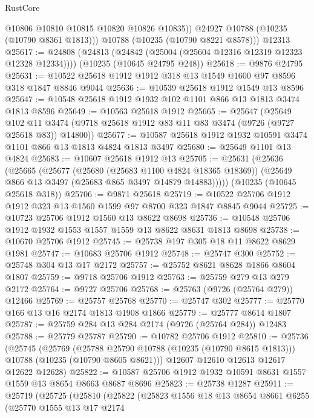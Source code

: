 \begin{lexlean}{RustCore}
\begin{coremodule}
            @10806
            @10810
            @10815
            @10820
            @10826
            @10835))
        @24927
        @10788
        (@10235 (@10790 @8361 @1813)))
      @10788
      (@10235 (@10790 @8221 @8578)))
    @12313
@25617 := @24808
    (@24813 (@24842 (@25004 (@25604 @12316 @12319 @12323 @12328 @12334))))
    (@10235 (@10645 @24795 @248))
@25618 := @9876 @24795
@25631 := @10522 @25618 @1912 @1912 @318 @13 @1549 @1600 @97 @8596 @318 @1847 @8846 @9044
@25636 := @10539 @25618 @1912 @1549 @13 @8596
@25647 := @10548 @25618 @1912 @1932 @102 @1101 @866 @13 @1813 @3474 @1813 @8596
@25649 := @10563 @25618 @1912
@25665 := @25647
    (@25649 @102 @11 @3474 (@9718 @25618 @1912 @83 @11 @83 @3474 (@9726 (@9727 @25618 @83)) @14800))
@25677 := @10587 @25618 @1912 @1932 @10591 @3474 @1101 @866 @13 @1813 @4824 @1813 @3497
@25680 := @25649 @1101 @13 @4824
@25683 := @10607 @25618 @1912 @13
@25705 := @25631
    (@25636
      (@25665
        (@25677
          (@25680 (@25683 @1100 @4824 @18365 @18369))
          (@25649 @866 @13 @3497 (@25683 @865 @3497 @14879 @14883)))))
    (@10235 (@10645 @25618 @318))
@25706 := @9871 @25618
@25719 := @10522 @25706 @1912 @1912 @323 @13 @1560 @1599 @97 @8700 @323 @1847 @8845 @9044
@25725 := @10723 @25706 @1912 @1560 @13 @8622 @8698
@25736 := @10548 @25706 @1912 @1932 @1553 @1557 @1559 @13 @8622 @8631 @1813 @8698
@25738 := @10670 @25706 @1912
@25745 := @25738 @197 @305 @18 @11 @8622 @8629 @1981
@25747 := @10683 @25706 @1912
@25748 := @25747 @300
@25752 := @25748 @304 @13 @17 @2172
@25757 := @25752 @8621 @8628 @1866 @8604 @1807
@25759 := @9718 @25706 @1912
@25763 := @25759 @279 @13 @279 @2172
@25764 := @9727 @25706
@25768 := @25763 (@9726 (@25764 @279)) @12466
@25769 := @25757 @25768
@25770 := @25747 @302
@25777 := @25770 @166 @13 @16 @2174 @1813 @1908 @1866
@25779 := @25777 @8614 @1807
@25787 := @25759 @284 @13 @284 @2174 (@9726 (@25764 @284)) @12483
@25788 := @25779 @25787
@25790 := @10782 @25706 @1912
@25810 := @25736
    (@25745
      (@25769
        (@25788 @25790 @10788 (@10235 (@10790 @8615 @1813)))
        @10788
        (@10235 (@10790 @8605 @8621)))
      @12607
      @12610
      @12613
      @12617
      @12622
      @12628)
@25822 := @10587 @25706 @1912 @1932 @10591 @8631 @1557 @1559 @13 @8654 @8663 @8687 @8696
@25823 := @25738 @1287
@25911 := @25719
    (@25725
      (@25810
        (@25822
          (@25823
            @1556
            @18
            @13
            @8654
            @8661
            @6255
            (@25770
              @1555
              @13
              @17
              @2174

\end{coremodule}
\end{lexlean}
